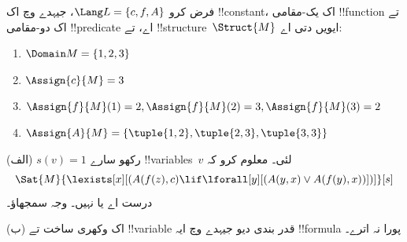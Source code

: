\documentclass[../../../include/open-logic-section]{subfiles}
\begin{document}
\begin{prob}
فرض کرو $\Lang L = \{c, f, A\}$، جیہدے وچ اک !!{constant}،
اک یک-مقامی !!{function} تے اک دو-مقامی !!{predicate} اے، تے
!!{structure}~$\Struct{M}$ ایویں دتی اے:
\begin{enumerate}
\item $\Domain M = \{1, 2, 3\}$
\item $\Assign{c}{M} = 3$
\item $\Assign{f}{M}(1) = 2, \Assign{f}{M}(2) = 3, \Assign{f}{M}(3) = 2$
\item $\Assign{A}{M} = \{\tuple{1, 2}, \tuple{2, 3}, \tuple{3, 3}\}$
\end{enumerate}
(الف) $s(v) = 1$ رکھو سارے !!{variable}s~$v$ لئی۔ معلوم کرو کہ
\[
\Sat{M}{\lexists[x][(A(f(z), c) \lif \lforall[y][(A(y, x) \lor A(f(y),
      x))])]}[s]
\]
درست اے یا نہیں۔ وجہ سمجھاؤ۔

(ب) اک وکھری ساخت تے !!{variable} قدر بندی دیو جیہدے وچ
ایہ !!{formula} پورا نہ اترے۔
\end{prob}
\end{document}
